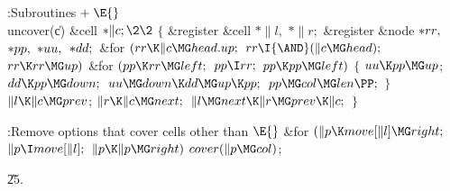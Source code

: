 \Y\B\4:Subroutines\X${}\mathrel+\E{}$\6
\\{uncover}(\|c)\1\1\6
\&{cell} ${}{*}\|c;\2\2{}$\6
${}\{{}$\5
\1\&{register} \&{cell} ${}{*}\|l,{}$ ${}{*}\|r;{}$\6
\&{register} \&{node} ${}{*}\\{rr},{}$ ${}{*}\\{pp},{}$ ${}{*}\\{uu},{}$ ${}{*}%
\\{dd};{}$\7
\&{for} ${}(\\{rr}\K\|c\MG\\{head}.\\{up};{}$ ${}\\{rr}\I{\AND}(\|c\MG%
\\{head});{}$ ${}\\{rr}\K\\{rr}\MG\\{up}){}$\1\6
\&{for} ${}(\\{pp}\K\\{rr}\MG\\{left};{}$ ${}\\{pp}\I\\{rr};{}$ ${}\\{pp}\K%
\\{pp}\MG\\{left}){}$\5
${}\{{}$\1\6
${}\\{uu}\K\\{pp}\MG\\{up}{}$;\5
${}\\{dd}\K\\{pp}\MG\\{down};{}$\6
${}\\{uu}\MG\\{down}\K\\{dd}\MG\\{up}\K\\{pp};{}$\6
${}\\{pp}\MG\\{col}\MG\\{len}\PP;{}$\6
\4${}\}{}$\2\2\6
${}\|l\K\|c\MG\\{prev}{}$;\5
${}\|r\K\|c\MG\\{next};{}$\6
${}\|l\MG\\{next}\K\|r\MG\\{prev}\K\|c;{}$\6
\4${}\}{}$\2\par
\fi

\B{}:Remove options that cover cells other than \X${}\E{}$\6
\&{for} ${}(\|p\K\\{move}[\|l]\MG\\{right};{}$ ${}\|p\I\\{move}[\|l];{}$ ${}\|p%
\K\|p\MG\\{right}){}$\1\5
${}\\{cover}(\|p\MG\\{col}){}$;\2\par
\U25.\fi


